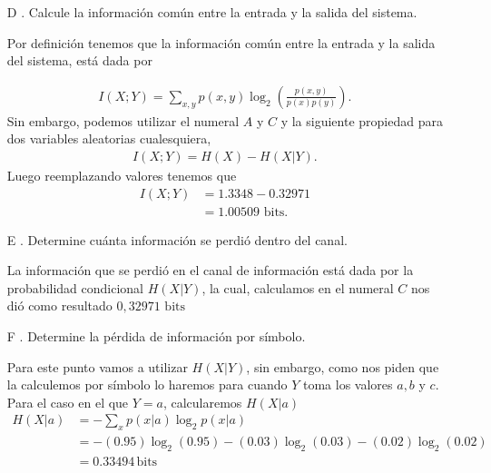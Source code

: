 \begin{enumerate}
\begin{sol}
\end{sol}

    \item[D]. Calcule la información común entre la entrada y la salida del sistema.\\
    \begin{sol}

    Por definición tenemos que la información común entre la entrada y la salida del sistema, está dada por

    \begin{align*}
        I(X;Y) = \sum_{x,y} p(x, y) \log_2 \left( \frac{p(x, y)}{p(x) p(y)}\right)
    .\end{align*}
    Sin embargo, podemos utilizar el numeral $A$ y $C$ y la siguiente propiedad para dos variables aleatorias cualesquiera,
    \begin{align*}
        I(X;Y) =H(X)-H(X|Y)
    .\end{align*}
    Luego reemplazando valores tenemos que 
    \begin{align*}
        I(X;Y) &=1.3348-0.32971\\
        &=1.00509 \text{ bits}
    .\end{align*}
    \end{sol}


    \item[E]. Determine cuánta información se perdió dentro del canal.

\begin{sol}
La información que se perdió en el canal de información está dada por la probabilidad condicional $H(X|Y)$, la cual, calculamos en el numeral $C$ nos dió como resultado $0,32971 \text{ bits}$

\end{sol}

    \item[F]. Determine la pérdida de información por símbolo.
  \begin{sol}
Para este punto vamos a utilizar $H(X|Y)$, sin embargo, como nos piden que la calculemos por símbolo lo haremos para cuando $Y$ toma los valores $a,b$ y $c$.\\
 Para el caso en el que $Y=a$, calcularemos $H(X|a)$
    \begin{align*}
    H(X| a) &= - \sum_{x} p(x|a) \log_2 p(x|a) \\
    &= -(0.95) \log_2 (0.95) - (0.03) \log_2 (0.03) - (0.02) \log_2 (0.02) \\
    &= 0.33494 \, \text{bits}
    \end{align*}


\end{sol}
\end{enumerate}
